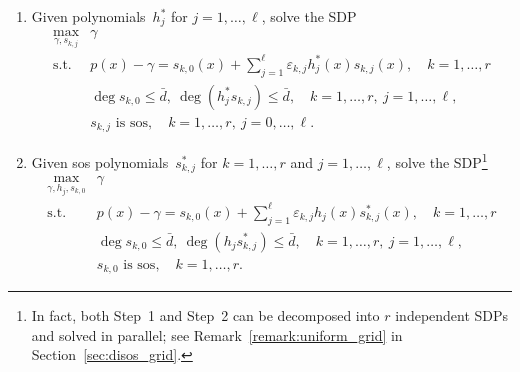 \documentclass[12pt]{article}
\newcommand{\SOS}{\mathbf{\Sigma}}
\newcommand{\st}{\text{s.t.}}
\theoremstyle{remark}
\begin{document}
\begin{enumerate}
    \item 
    Given polynomials~$h_j^*$ for $j=1,\ldots,\ell$, solve the SDP
    \begin{equation*}
	\begin{array}{cl}
\max\limits_{\gamma,s_{k,j}} & \gamma\\
		\st & p(x)-\gamma =s_{k,0}(x)+\sum\limits_{j=1}^{\ell} \varepsilon_{k,j}h_j^*(x)s_{k,j}(x),\quad  k=1,\ldots,r\\
         & \deg s_{k,0}\le \bar{d},\ 
\deg(h_j^*s_{k,j})\le \bar{d},\quad  k=1,\ldots,r,\ j = 1,\ldots, \ell,\\
& s_{k,j} \text{ is sos},\quad  k=1,\ldots,r,\ j = 0,\ldots, \ell.
	\end{array}
\end{equation*}
    \item Given sos polynomials~$s_{k,j}^*$ for $k=1,\ldots,r$ and $j=1,\ldots,\ell$, solve the SDP\footnote{{In fact, both Step~1 and Step~2 can be decomposed into $r$ independent SDPs and solved in parallel; see Remark~\ref{remark:uniform_grid} in Section~\ref{sec:disos_grid}.}} 
     \begin{equation*}
	\begin{array}{cl}
\max\limits_{\gamma,h_j,s_{k,0}} & \gamma\\
		\st & p(x)-\gamma =s_{k,0}(x)+\sum\limits_{j=1}^{\ell} \varepsilon_{k,j}h_j(x)s_{k,j}^*(x),\quad  k=1,\ldots,r\\
         & \deg s_{k,0}\le \bar{d},\ \deg(h_js_{k,j}^*)\le \bar{d},\quad  k=1,\ldots,r,\ j = 1,\ldots, \ell,\\
& s_{k,0} \text{ is sos},\quad  k=1,\ldots,r.
	\end{array}
\end{equation*}   
\end{enumerate}
\end{document}
